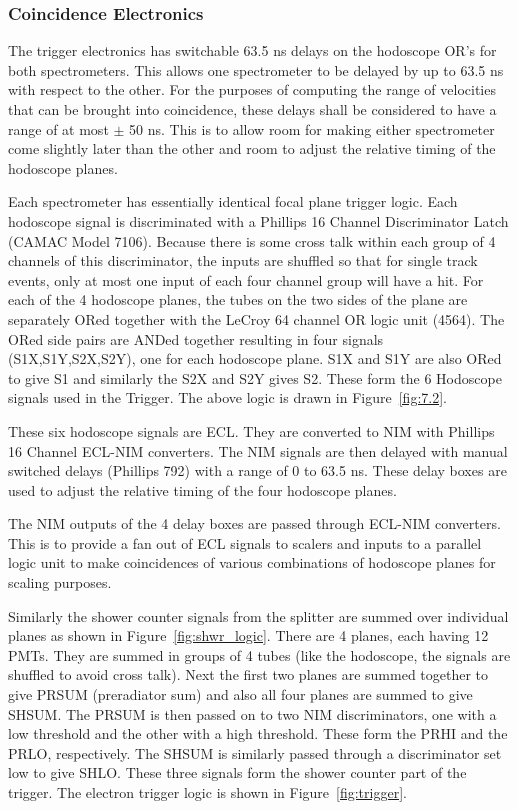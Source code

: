 \subsubsection{Coincidence Electronics}

The trigger electronics has switchable 63.5 ns delays on the hodoscope
OR's for both spectrometers. This allows one spectrometer to be delayed
by up to 63.5 ns with respect to the other. For the purposes of computing
the range of velocities that can be brought into coincidence, these delays
shall be considered to have a range of at most $\pm$ 50 ns. This is to
allow room for making either spectrometer come slightly later than the
other and room to adjust the relative timing of the hodoscope planes.

Each spectrometer has essentially identical focal plane trigger logic.
Each hodoscope signal is discriminated with a Phillips 16 Channel
Discriminator Latch (CAMAC Model 7106). Because there is some cross talk
within each group of 4 channels of this discriminator, the inputs are shuffled
so that for single track events, only at most one input of each four
channel group will have a hit. For each of the 4 hodoscope planes, the
tubes on the two sides of the plane are separately ORed together with
the LeCroy 64 channel OR logic unit (4564). The ORed side pairs are
ANDed together resulting in four signals (S1X,S1Y,S2X,S2Y), one for each
hodoscope plane. S1X and S1Y are also ORed to give S1 and similarly the
S2X and S2Y gives S2. These form the 6 Hodoscope signals used in the
Trigger. The above logic is drawn in Figure~\ref{fig:7.2}.

These six hodoscope signals are ECL. They are converted to NIM with
Phillips 16 Channel ECL-NIM converters. The NIM signals are then delayed
with manual switched delays (Phillips 792) with a range of 0 to 63.5 ns.
These delay boxes are used to adjust the relative timing of the
four hodoscope planes.

The NIM outputs of the 4 delay boxes are passed through ECL-NIM
converters. This is to provide a fan out of ECL signals to scalers and
inputs to a parallel logic unit to make coincidences of various
combinations of hodoscope planes for scaling purposes.

Similarly the shower counter signals from the splitter are summed over
individual planes as shown in Figure~\ref{fig:shwr_logic}.
There are 4 planes, each having 12 PMTs. They are
summed in groups of 4 tubes (like the hodoscope, the signals are shuffled to
avoid cross talk). Next the first two planes are summed together to give
PRSUM (preradiator sum) and also all four planes are summed to give SHSUM. The
PRSUM is then passed on to two NIM discriminators, one with a low threshold
and the other with a high threshold. These form the PRHI and the PRLO,
respectively. The SHSUM is similarly passed through a discriminator set low to
give SHLO. These three signals form the shower counter part of the trigger.
The electron trigger logic is shown in Figure~\ref{fig:trigger}.


